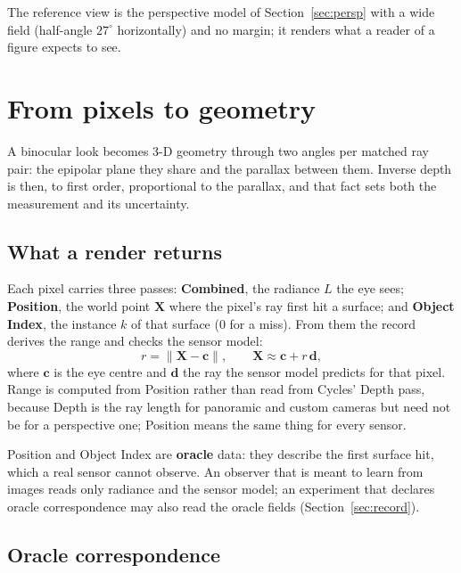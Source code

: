 \documentclass[11pt,a4paper]{article}
\newcommand{\vb}[1]{\mathbf{#1}}
\begin{document}
The reference view is the perspective model of Section~\ref{sec:persp} with a wide field (half-angle $27^\circ$
horizontally) and no margin; it renders what a reader of a figure expects to see.

\section{From pixels to geometry}\label{sec:geometry}

A binocular look becomes 3-D geometry through two angles per matched ray pair: the epipolar plane they share and
the parallax between them. Inverse depth is then, to first order, proportional to the parallax, and that fact
sets both the measurement and its uncertainty.

\subsection{What a render returns}\label{sec:passes}

Each pixel carries three passes: \textbf{Combined}, the radiance $L$ the eye sees; \textbf{Position}, the world
point $\vb{X}$ where the pixel's ray first hit a surface; and \textbf{Object Index}, the instance $k$ of that
surface (0 for a miss). From them the record derives the range and checks the sensor model:
\begin{equation}\label{eq:range}
r = \lVert \vb{X} - \vb{c} \rVert, \qquad \vb{X} \approx \vb{c} + r\,\vb{d},
\end{equation}
where $\vb{c}$ is the eye centre and $\vb{d}$ the ray the sensor model predicts for that pixel. Range is computed
from Position rather than read from Cycles' Depth pass, because Depth is the ray length for panoramic and custom
cameras but need not be for a perspective one; Position means the same thing for every sensor.

Position and Object Index are \textbf{oracle} data: they describe the first surface hit, which a real sensor
cannot observe. An observer that is meant to learn from images reads only radiance and the sensor model; an
experiment that declares oracle correspondence may also read the oracle fields (Section~\ref{sec:record}).

\subsection{Oracle correspondence}\label{sec:oracle}
\end{document}
